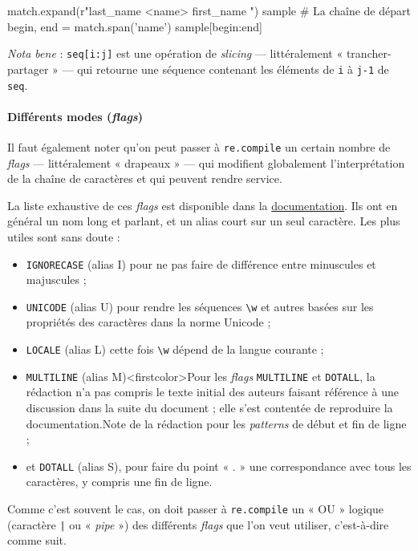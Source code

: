 \begin{idleconsole}
	\begin{pyconsole}
match.expand(r"last_name \g<name> first_name \1")
sample # La chaîne de départ
begin, end = match.span('name')
sample[begin:end]
	\end{pyconsole}
\end{idleconsole}

\textit{Nota bene} : \texttt{seq[i:j]} est une opération de \textit{slicing} --- littéralement « trancher-partager » --- qui retourne une séquence contenant les éléments de \texttt{i} à \texttt{j-1} de \texttt{seq}.

\paragraph{Différents modes (\textit{flags})}
Il faut également noter qu'on peut passer à \texttt{re.compile} un certain nombre de \textit{flags} --- littéralement « drapeaux » --- qui modifient globalement l'interprétation de la chaîne de caractères et qui peuvent rendre service.

La liste exhaustive de ces \textit{flags} est disponible dans la \href{https://docs.python.org/3/library/re.html#module-contents}{documentation}. Ils ont en général un nom long et parlant, et un alias court sur un seul caractère. Les plus utiles sont sans doute :
\begin{itemize}
\item \texttt{IGNORECASE} (alias I) pour ne pas faire de différence entre minuscules et majuscules ;
\item \texttt{UNICODE} (alias U) pour rendre les séquences \lstinline[basicstyle={\small\shellttfont}]{\w} et autres basées sur les propriétés des caractères dans la norme Unicode ;
\item \texttt{LOCALE} (alias L) cette fois \lstinline[basicstyle={\small\shellttfont}]{\w} dépend de la langue courante ;
\item \texttt{MULTILINE} (alias M)\caution[b]<firstcolor>{Pour les \textit{flags} \texttt{MULTILINE} et \texttt{DOTALL}, la rédaction n'a pas compris le texte initial des auteurs faisant référence à une discussion dans la suite du document ; elle s'est contentée de reproduire la documentation.}{Note de la rédaction} pour les \textit{patterns} de début et fin de ligne ;
\item et \texttt{DOTALL} (alias S), pour faire du point « . » une correspondance avec tous les caractères, y compris une fin de ligne.
\end{itemize}
Comme c'est souvent le cas, on doit passer à \texttt{re.compile} un « OU » logique (caractère \texttt{|} ou « \textit{pipe} ») des différents \textit{flags} que l'on veut utiliser, c'est-à-dire comme suit.

